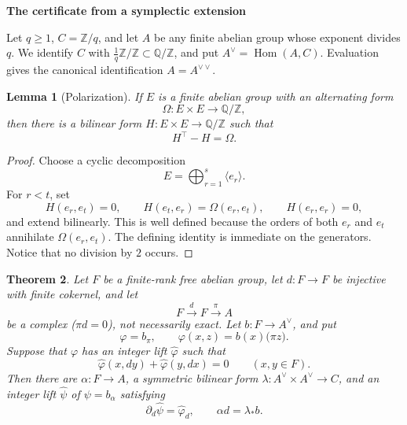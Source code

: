 \documentclass[11pt]{article}
\newcommand{\Z}{\mathbb Z}
\newcommand{\Q}{\mathbb Q}
\newcommand{\Hom}{\operatorname{Hom}}
\newtheorem{theorem}{Theorem}
\newtheorem{lemma}[theorem]{Lemma}
\theoremstyle{remark}
\begin{document}
\begin{center}
{\Large\bfseries The certificate from a symplectic extension}
\end{center}

Let \(q\geq1\), \(C=\Z/q\), and let \(A\) be any finite abelian
group whose exponent divides \(q\).  We identify \(C\) with
\(\frac1q\Z/\Z\subset\Q/\Z\), and put
\(A^\lor=\Hom(A,C)\).  Evaluation gives the canonical
identification \(A=A^{\lor\lor}\).

\begin{lemma}[Polarization]\label{lem:polarization}
If \(E\) is a finite abelian group with an alternating form
\[
             \Omega:E\times E\longrightarrow\Q/\Z ,
\]
then there is a bilinear form \(H:E\times E\to\Q/\Z\) such that
\[
                         H^\top-H=\Omega .                    \tag{1}
\]
\end{lemma}

\begin{proof}
Choose a cyclic decomposition
\[
                         E=\bigoplus_{r=1}^s\langle e_r\rangle .
\]
For \(r<t\), set
\[
 H(e_r,e_t)=0,\qquad H(e_t,e_r)=\Omega(e_r,e_t),\qquad
 H(e_r,e_r)=0,
\]
and extend bilinearly.  This is well defined because the orders of
both \(e_r\) and \(e_t\) annihilate \(\Omega(e_r,e_t)\).  The defining
identity is immediate on the generators.  Notice that no division by
\(2\) occurs.
\end{proof}

\begin{theorem}\label{thm:certificate}
Let \(F\) be a finite-rank free abelian group, let
\(d:F\to F\) be injective with finite cokernel, and let
\[
             F\xrightarrow{\,d\,}F\xrightarrow{\,\pi\,}A
\]
be a complex (\(\pi d=0\)), not necessarily exact.  Let
\(b:F\to A^\lor\), and put
\[
             \varphi=b_\pi,\qquad
             \varphi(x,z)=b(x)\bigl(\pi z\bigr).
\]
Suppose that \(\varphi\) has an integer lift \(\widehat\varphi\) such
that
\[
 \widehat\varphi(x,dy)+\widehat\varphi(y,dx)=0
 \qquad(x,y\in F).                                           \tag{2}
\]
Then there are \(\alpha:F\to A\), a symmetric bilinear form
\(\lambda:A^\lor\times A^\lor\to C\), and an integer lift
\(\widehat\psi\) of \(\psi=b_\alpha\) satisfying
\[
 \partial_d\widehat\psi=\widehat\varphi_d,
 \qquad
 \alpha d=\lambda_*b.                                       \tag{3}
\]
\end{theorem}
\end{document}
